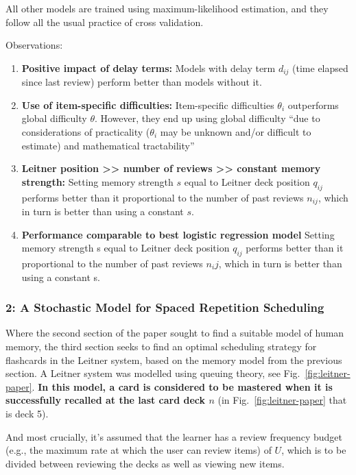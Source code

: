 All other models are trained using maximum-likelihood estimation, and
they follow all the usual practice of cross validation.

Observations:

\begin{enumerate}
\def\labelenumi{\arabic{enumi}.}
\tightlist
\item
  \textbf{Positive impact of delay terms: }Models with delay term
  \(d_{ij}\) (time elapsed since last review) perform better than models
  without it.
\item
  \textbf{Use of item-specific difficulties:} Item-specific difficulties
  \(\theta_i\) outperforms global difficulty \(\theta\). However, they
  end up using global difficulty ``due to considerations of practicality
  (\(\theta_i\) may be unknown and/or difficult to estimate) and
  mathematical tractability''
\item
  \textbf{Leitner position \textgreater{}\textgreater{} number of
  reviews \textgreater{}\textgreater{} constant memory strength:
  }Setting memory strength \(s\) equal to Leitner deck position
  \(q_{ij}\) performs better than it proportional to the number of past
  reviews \(n_{ij}\), which in turn is better than using a constant
  \(s\).
\item
  \textbf{Performance comparable to best logistic regression model
  }Setting memory strength s equal to Leitner deck position \(q_{ij}\)
  performs better than it proportional to the number of past reviews
  \(n{_ij}\), which in turn is better than using a constant s.
\end{enumerate}

\subsubsection{2: A Stochastic Model for Spaced Repetition
Scheduling}\label{a-stochastic-model-for-spaced-repetition-scheduling}

Where the second section of the paper sought to find a suitable model of
human memory, the third section seeks to find an optimal scheduling
strategy for flashcards in the Leitner system, based on the memory model
from the previous section. A Leitner system was modelled using queuing
theory, see Fig.~\ref{fig:leitner-paper}. \textbf{In this model, a card
is considered to be mastered when it is successfully recalled at the
last card deck \(n\)} (in Fig.~\ref{fig:leitner-paper} that is deck 5).

And most crucially, it's assumed that the learner has a review frequency
budget (e.g., the maximum rate at which the user can review items) of
\(U\), which is to be divided between reviewing the decks as well as
viewing new items.

